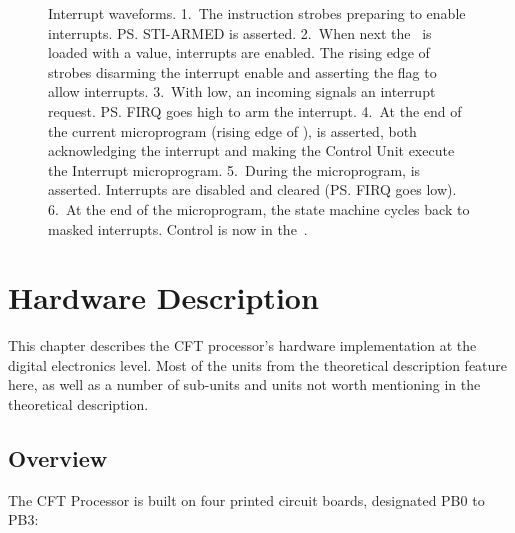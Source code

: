 \begin{figure}
  \centering
  \caption[CFT Processor Interrupt
    Waveforms]{\label{hard:proc:interrupt-waveforms}Interrupt waveforms. 1.~The
     instruction strobes  preparing to enable
    interrupts. \ps{STI-ARMED} is asserted. 2.~When next the \PC~is loaded with
    a value, interrupts are enabled. The rising edge of  strobes
     disarming the interrupt enable and asserting the 
    flag to allow interrupts. 3.~With  low, an incoming 
    signals an interrupt request. \ps{FIRQ} goes high to arm the
    interrupt. 4.~At the end of the current microprogram (rising edge of
    ),  is asserted, both acknowledging the interrupt and
    making the Control Unit execute the Interrupt microprogram. 5.~During the
    microprogram,  is asserted. Interrupts are disabled and cleared
    (\ps{FIRQ} goes low). 6.~At the end of the microprogram, the state machine
    cycles back to masked interrupts. Control is now in the~.}
\end{figure}



\chapter{Hardware Description}

This chapter describes the CFT processor's hardware implementation at
the digital electronics level. Most of the units from the theoretical
description feature here, as well as a number of sub-units and units
not worth mentioning in the theoretical description.

\section{Overview}

The CFT Processor is built on four printed circuit boards, designated
PB0 to PB3:

